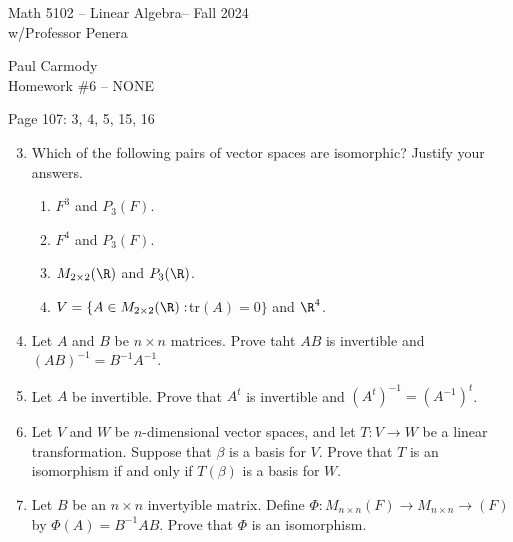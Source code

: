 \documentclass[10pt,a4paper]{report}
\newcommand{\CLASSNAME}{Math 5102 -- Linear Algebra}
\newcommand{\STUDENTNAME}{Paul Carmody}
\newcommand{\ASSIGNMENT}{Homework \#6 }
\newcommand{\DUEDATE}{NONE}
\newcommand{\SEMESTER}{Fall 2024}
\begin{document}
\begin{center}
	\Large{\CLASSNAME -- \SEMESTER} \\
	\large{ w/Professor Penera}
\end{center}
\begin{center}
	\STUDENTNAME \\
	\ASSIGNMENT -- \DUEDATE\\
\end{center} 
Page 107: 3, 4, 5, 15, 16

\begin{enumerate}[label=Page 107:\arabic*.]
	\setcounter{enumi}{2}
	\item Which of the following pairs of vector spaces are isomorphic?  Justify your answers.
	\begin{enumerate}[label=(\alph*)]
		\item $F^3$ and $P_3(F)$.
		\item $F^4$ and $P_3(F)$.
		\item $M_{2\times 2}(\R)$ and $P_3(\R)$.
		\item $V=\{A \in M_{2\times 2}(\R): $tr$(A) = 0\}$ and $\R^4$.	
	\end{enumerate}
	\item Let $A$ and $B$ be $n \times n$ matrices.  Prove taht $AB$ is invertible and $(AB)^{-1} = B^{-1}A^{-1}$.
	\item Let $A$ be invertible. Prove that $A^t$ is invertible and $(A^t)^{-1} = (A^{-1})^t$.
	\setcounter{enumi}{14}
	\item Let $V$ and $W$ be $n$-dimensional vector spaces, and let $T: V \to W$ be a linear transformation.  Suppose that $\beta$ is a basis for $V$.  Prove that $T$ is an isomorphism if and only if $T(\beta)$ is a basis for $W$.
	\item Let $B$ be an $n\times n$ invertyible matrix.  Define $\Phi: M_{n\times n}(F) \to M_{n\times n}\to (F)$ by $\Phi(A) = B^{-1}AB$.  Prove that $\Phi$ is an isomorphism.
\end{enumerate}
\end{document}
